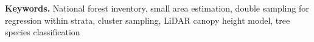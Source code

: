 

\vspace{0.2cm} \noindent \textbf{Keywords.} National forest inventory, small area estimation, double sampling for regression within strata, cluster sampling, LiDAR canopy height model, tree species classification \vspace{-1cm}

